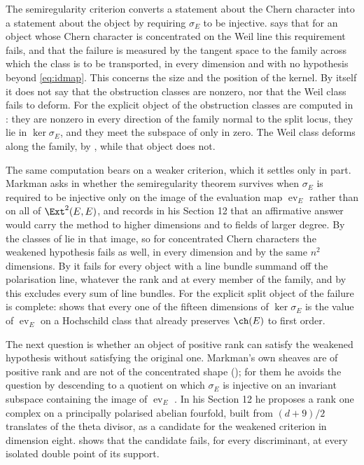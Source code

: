 \begin{remark}
\label{rem:whatmeasures}
The semiregularity criterion converts a statement about the Chern character
into a statement about the object by requiring $\sigma_{E}$ to be injective.
 says that for an object whose Chern character is
concentrated on the Weil line this requirement fails, and that the failure is
measured by the tangent space to the family across which the class is to be
transported, in every dimension and with no hypothesis beyond
\eqref{eq:idmap}. This concerns the size and the position of the kernel. By
itself it does not say that the obstruction classes are nonzero, nor that
the Weil class fails to deform. For the explicit object of
\cite[Proposition~4.14]{paperII} the obstruction classes are computed in
\cite[Proposition~4.16]{paperII}: they are nonzero in every direction of the
family normal to the split locus, they lie in $\ker\sigma_{E}$, and they meet
the subspace of  only in zero. The Weil class deforms
along the family, by , while that object does not.

The same computation bears on a weaker criterion, which it settles only in
part. Markman asks in \cite[Question 11.4]{Mar25b} whether the
semiregularity theorem survives when $\sigma_{E}$ is required to be injective
only on the image of the evaluation map $\operatorname{ev}_{E}$ rather than
on all of $\Ext^{2}(E,E)$, and records in his Section 12 that an affirmative
answer would carry the method to higher dimensions and to fields of larger
degree. By  the classes of  lie in
that image, so for concentrated Chern characters the weakened hypothesis
fails as well, in every dimension and by the same $n^{2}$ dimensions. By
 it fails for every object with a line bundle summand
off the polarisation line, whatever the rank and at every member of the
family, and by \cite[Corollary~4.21]{paperII} this excludes every sum of line bundles.
For the explicit split object of \cite[Proposition~4.14]{paperII} the failure is
complete: \cite[Proposition~4.18]{paperII} shows that every one of the fifteen
dimensions of $\ker\sigma_{E}$ is the value of $\operatorname{ev}_{E}$ on a
Hochschild class that already preserves $\ch(E)$ to first order.

The next question is whether an object of positive rank can satisfy the
weakened hypothesis without satisfying the original one. Markman's own
sheaves are of positive rank and are not of the concentrated shape
(); for them he avoids the question by descending to
a quotient on which $\sigma_{E}$ is injective on an invariant subspace
containing the image of $\operatorname{ev}_{E}$
\cite[Proposition~11.5]{Mar25b}. In his Section 12 he proposes a rank one
complex on a principally polarised abelian fourfold, built from $(d+9)/2$
translates of the theta divisor, as a candidate for the weakened criterion in
dimension eight. \cite[Theorem~4.61]{paperII}
shows that the candidate fails, for every discriminant, at every isolated
double point of its support.


\end{remark}
